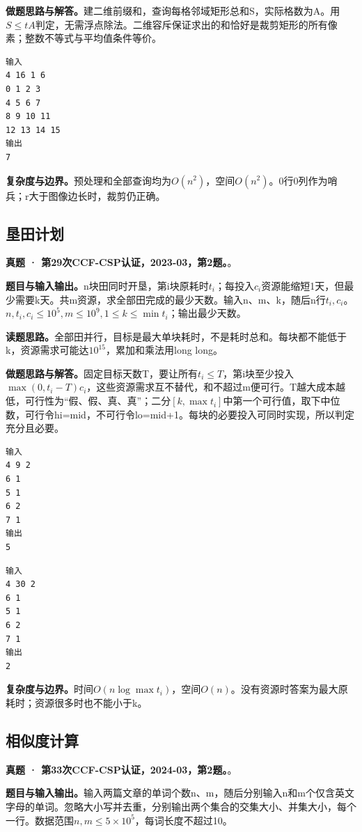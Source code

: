 \noindent\textbf{做题思路与解答。}建二维前缀和，查询每格邻域矩形总和S，实际格数为A。用$S\le tA$判定，无需浮点除法。二维容斥保证求出的和恰好是裁剪矩形的所有像素；整数不等式与平均值条件等价。
\begin{verbatim}
输入
4 16 1 6
0 1 2 3
4 5 6 7
8 9 10 11
12 13 14 15
输出
7
\end{verbatim}

\noindent\textbf{复杂度与边界。}预处理和全部查询均为$O(n^2)$，空间$O(n^2)$。0行0列作为哨兵；r大于图像边长时，裁剪仍正确。
\subsection{垦田计划}
\textbf{真题 · 第29次CCF-CSP认证，2023-03，第2题。}。

\noindent\textbf{题目与输入输出。}n块田同时开垦，第i块原耗时$t_i$；每投入$c_i$资源能缩短1天，但最少需要k天。共m资源，求全部田完成的最少天数。输入n、m、k，随后n行$t_i,c_i$。$n,t_i,c_i\le10^5,m\le10^9,1\le k\le\min t_i$；输出最少天数。

\noindent\textbf{读题思路。}全部田并行，目标是最大单块耗时，不是耗时总和。每块都不能低于k，资源需求可能达$10^{15}$，累加和乘法用long long。

\noindent\textbf{做题思路与解答。}固定目标天数T，要让所有$t_i\le T$，第i块至少投入$\max(0,t_i-T)c_i$，这些资源需求互不替代，和不超过m便可行。T越大成本越低，可行性为“假、假、真、真”；二分$[k,\max t_i]$中第一个可行值，取下中位数，可行令hi=mid，不可行令lo=mid+1。每块的必要投入可同时实现，所以判定充分且必要。
\begin{verbatim}
输入
4 9 2
6 1
5 1
6 2
7 1
输出
5
\end{verbatim}
\begin{verbatim}
输入
4 30 2
6 1
5 1
6 2
7 1
输出
2
\end{verbatim}

\noindent\textbf{复杂度与边界。}时间$O(n\log\max t_i)$，空间$O(n)$。没有资源时答案为最大原耗时；资源很多时也不能小于k。
\subsection{相似度计算}
\textbf{真题 · 第33次CCF-CSP认证，2024-03，第2题。}。

\noindent\textbf{题目与输入输出。}输入两篇文章的单词个数n、m，随后分别输入n和m个仅含英文字母的单词。忽略大小写并去重，分别输出两个集合的交集大小、并集大小，每个一行。数据范围$n,m\le5\times10^5$，每词长度不超过10。

